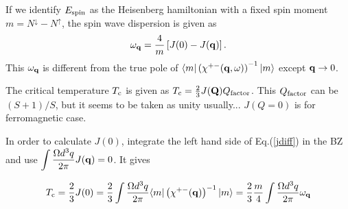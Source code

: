 \documentclass[a4paper,10pt,epsf,fleqn]{article}
\newcommand{\bfq}{{\bf q}}
\newcommand{\bfQ}{{\bf Q}}
\newcommand{\ds}{\displaystyle}
\newcommand{\ispone}{\downarrow}
\newcommand{\isptwo}{\uparrow}
\newcommand{\req}[1]{Eq.(\ref{#1})}
\begin{document}

If we identify $ E_{\rm spin}$ as the Heisenberg hamiltonian
with a fixed spin moment $m = N^{\ispone}- N^{\isptwo}$,
the spin wave dispersion is given as
\begin{eqnarray}
\omega_\bfq = \frac{4}{m} \left[ J(0) -J(\bfq) \right].
\label{omegaq}
\end{eqnarray}
This $\omega_\bfq$ is different from the true pole of 
$\langle m| \left( \chi^{+-}(\bfq,\omega) \right)^{-1} |m \rangle$ 
 except
$\bfq \to 0$.

The critical temperature $T_{\rm c}$ is given as
$T_{\rm c} = \frac{2}{3} J(\bfQ) Q_{\rm factor}$.
This $Q_{\rm factor}$ can be $(S+1)/S$, but 
it seems to be taken as unity usually...
$J(Q=0)$ is for ferromagnetic case.

In order to calculate $J(0)$,
integrate the left hand side of Eq.(\ref{jdiff}) in the BZ
and use $\ds \int \frac{\Omega d^3 q}{2 \pi} J(\bfq)=0$. It gives

\begin{eqnarray}
T_{\rm c} = \frac{2}{3} J(0) = 
\frac{2}{3} \int \frac{\Omega d^3 q}{2 \pi}
\langle m| \left( \chi^{+-}(\bfq) \right)^{-1} |m \rangle 
= 
\frac{2}{3} \frac{m}{4} \int \frac{\Omega d^3 q}{2 \pi} \omega_\bfq 
\label{tceq}
\end{eqnarray}
\end{document}
